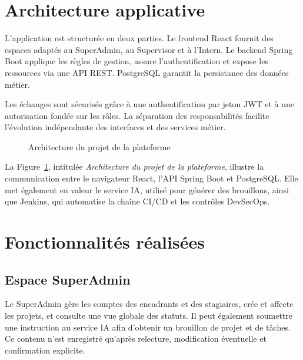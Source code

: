 \section{Architecture applicative}
L'application est structurée en deux parties. Le frontend React fournit des espaces adaptés au SuperAdmin, au Supervisor et à l'Intern. Le backend Spring Boot applique les règles de gestion, assure l'authentification et expose les ressources via une API REST. PostgreSQL garantit la persistance des données métier.

Les échanges sont sécurisés grâce à une authentification par jeton JWT et à une autorisation fondée sur les rôles. La séparation des responsabilités facilite l'évolution indépendante des interfaces et des services métier.

\begin{figure}[h]
\centering
{}
\caption{Architecture du projet de la plateforme}
\label{fig-architecture-plateforme}
\end{figure}

La Figure~\ref{fig-architecture-plateforme}, intitulée \textit{Architecture du projet de la plateforme}, illustre la communication entre le navigateur React, l'API Spring Boot et PostgreSQL. Elle met également en valeur le service IA, utilisé pour générer des brouillons, ainsi que Jenkins, qui automatise la chaîne CI/CD et les contrôles DevSecOps.

\section{Fonctionnalités réalisées}
\subsection{Espace SuperAdmin}
Le SuperAdmin gère les comptes des encadrants et des stagiaires, crée et affecte les projets, et consulte une vue globale des statuts. Il peut également soumettre une instruction au service IA afin d'obtenir un brouillon de projet et de tâches. Ce contenu n'est enregistré qu'après relecture, modification éventuelle et confirmation explicite.

